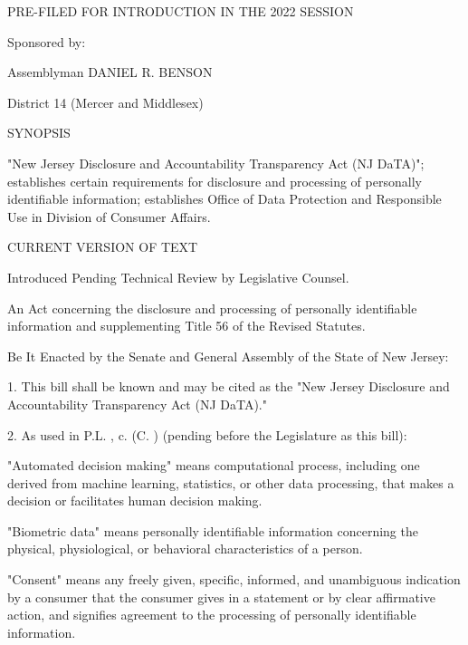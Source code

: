 PRE-FILED FOR INTRODUCTION IN THE 2022 SESSION

 


 

Sponsored by:

Assemblyman  DANIEL R. BENSON

District 14 (Mercer and Middlesex)

 

 

 

 

SYNOPSIS

     "New Jersey Disclosure and Accountability Transparency Act (NJ DaTA)"; establishes certain requirements for disclosure and processing of personally identifiable information; establishes Office of Data Protection and Responsible Use in Division of Consumer Affairs.

 

CURRENT VERSION OF TEXT

     Introduced Pending Technical Review by Legislative Counsel.

  


An Act concerning the disclosure and processing of personally identifiable information and supplementing Title 56 of the Revised Statutes.

 

     Be It Enacted by the Senate and General Assembly of the State of New Jersey:

 

     1.    This bill shall be known and may be cited as the "New Jersey Disclosure and Accountability Transparency Act (NJ DaTA)."

 

     2.    As used in P.L.    , c.    (C.      ) (pending before the Legislature as this bill):

     "Automated decision making" means computational process, including one derived from machine learning, statistics, or other data processing, that makes a decision or facilitates human decision making.

     "Biometric data" means personally identifiable information concerning the physical, physiological, or behavioral characteristics of a person.

     "Consent" means any freely given, specific, informed, and unambiguous indication by a consumer that the consumer gives in a statement or by clear affirmative action, and signifies agreement to the processing of personally identifiable information.

